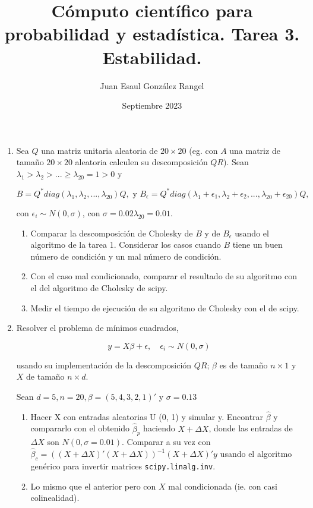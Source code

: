 \documentclass{article}
\title{Cómputo científico para probabilidad y estadística. Tarea 3.\\
Estabilidad.}
\author{Juan Esaul González Rangel}
\date{Septiembre 2023}
\begin{document}
\maketitle


\begin{enumerate}

    \item Sea $Q$ una matriz unitaria aleatoria de $20 \times 20$ (eg. con $A$ una 
    matriz de tamaño $20 \times 20$ aleatoria calculen su descomposición $QR$). 
    Sean $\lambda_1 > \lambda_2 > ... \ge \lambda_{20} = 1 > 0$ y 
    
    \[B = Q^*diag(\lambda_1, \lambda_2, ..., \lambda_{20})Q, \text{ y } B_\epsilon 
    = Q^*diag(\lambda_1+\epsilon_1, \lambda_2+\epsilon_2, ..., \lambda_{20}+\epsilon_{20})Q,\]

con $\epsilon_i \sim N (0, \sigma)$, con $\sigma = 0.02\lambda_{20} = 0.01$.

\begin{enumerate}
    \item Comparar la descomposición de Cholesky de $B$ y de $B_\epsilon$ usando el 
    algoritmo de la tarea 1. Considerar los casos cuando $B$ tiene un buen número de 
    condición y un mal número de condición.
    
    \item Con el caso mal condicionado, comparar el resultado de su algoritmo con 
    el del algoritmo de Cholesky de scipy.
    
    \item Medir el tiempo de ejecución de su algoritmo de Cholesky con el de scipy.
    
\end{enumerate}


    \item Resolver el problema de mínimos cuadrados,
    
        \[y = X\beta + \epsilon, \quad \epsilon_i \sim N (0, \sigma) \]

    usando su implementación de la descomposición $QR$; $\beta$ es de tamaño 
    $n \times 1$ y $X$ de tamaño $n \times d$.
    
    Sean $d = 5, n = 20, \beta = (5, 4, 3, 2, 1)'$ y $\sigma = 0.13$

    \begin{enumerate}
        \item Hacer X con entradas aleatorias U (0, 1) y simular y. Encontrar $\hat\beta$
         y compararlo con el obtenido $\hat\beta_p$ haciendo $X + \Delta X$, donde las 
         entradas de $\Delta X$ son $N (0, \sigma = 0.01)$. Comparar a su vez con 
         $\hat\beta_c = ((X + \Delta X)'(X + \Delta X))^{-1}(X + \Delta X)'y$ usando el 
         algoritmo genérico para invertir matrices \texttt{scipy.linalg.inv}.
        \item Lo mismo que el anterior pero con $X$ mal condicionada (ie. con casi colinealidad).
    \end{enumerate}



   
\end{enumerate}




 
\end{document}
